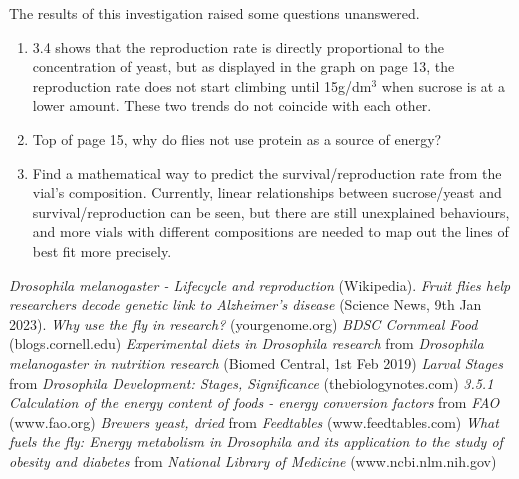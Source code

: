 \documentclass{article}
\begin{document}
The results of this investigation raised some questions unanswered.

\begin{enumerate}
  \item 3.4 shows that the reproduction rate is directly proportional to the concentration of yeast, but as displayed in the graph on page 13, the reproduction rate does not start climbing until 15g/dm$^3$ when sucrose is at a lower amount. These two trends do not coincide with each other.
  \item Top of page 15, why do flies not use protein as a source of energy?
  \item Find a mathematical way to predict the survival/reproduction rate from the vial's composition. Currently, linear relationships between sucrose/yeast and survival/reproduction can be seen, but there are still unexplained behaviours, and more vials with different compositions are needed to map out the lines of best fit more precisely.
\end{enumerate}

\newpage
\begin{thebibliography}{unsrt}
     \emph{Drosophila melanogaster - Lifecycle and reproduction} (Wikipedia).
     \emph{Fruit flies help researchers decode genetic link to Alzheimer's disease} (Science News, 9th Jan 2023).
     \emph{Why use the fly in research?} (yourgenome.org)
     \emph{BDSC Cornmeal Food} (blogs.cornell.edu)
     \emph{Experimental diets in Drosophila research} from \emph{Drosophila melanogaster in nutrition research} (Biomed Central, 1st Feb 2019)
     \emph{Larval Stages} from \emph{Drosophila Development: Stages, Significance} (thebiologynotes.com)
     \emph{3.5.1 Calculation of the energy content of foods - energy conversion factors} from \emph{FAO} (www.fao.org)
     \emph{Brewers yeast, dried} from \emph{Feedtables} (www.feedtables.com)
     \emph{What fuels the fly: Energy metabolism in Drosophila and its application to the study of obesity and diabetes} from \emph{National Library of Medicine} (www.ncbi.nlm.nih.gov)
\end{thebibliography}

\thispagestyle{fancy}
\fancyhead{}
\renewcommand{\headrulewidth}{0pt}
\end{document}
